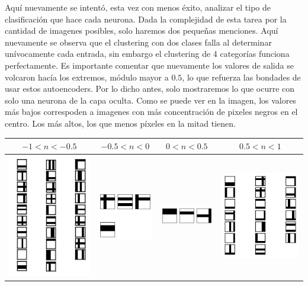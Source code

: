 \documentclass[12pt]{article}
\begin{document}
Aquí nuevamente se intentó, esta vez con menos éxito, analizar el tipo de clasificación que hace cada neurona. Dada la complejidad de esta tarea por la cantidad de imagenes posibles, solo haremos dos pequeñas menciones. Aquí nuevamente se observa que el clustering con dos clases falla al determinar unívocamente cada entrada, sin embargo el clustering de 4 categorías funciona perfectamente. Es importante comentar que nuevamente los valores de salida se volcaron hacía los extremos, módulo mayor a $0.5$, lo que refuerza las bondades de usar estos autoencoders. Por lo dicho antes, solo mostraremos lo que ocurre con solo una neurona de la capa oculta. Como se puede ver en la imagen, los valores más bajos correspoden a imagenes con más concentración de pixeles negros en el centro. Los más altos, los que menos píxeles en la mitad tienen.

\begin{center}
   \begin{tabular}{| c | c | c | c |}
     \hline
     $-1<n<-0.5$ & $-0.5<n<0$ & $0<n<0.5$ & $0.5<n<1$ \\ \hline
     \includegraphics[width=4cm]{graficosde5neuronas/atributo1Clase0} &
     \includegraphics[width=2.5cm]{graficosde5neuronas/atributo1Clase1} &
     \includegraphics[width=2.5cm]{graficosde5neuronas/atributo1Clase2} &
     \includegraphics[width=4cm]{graficosde5neuronas/atributo1Clase3} \\ \hline
   \end{tabular}
 \end{center}
\end{document}
